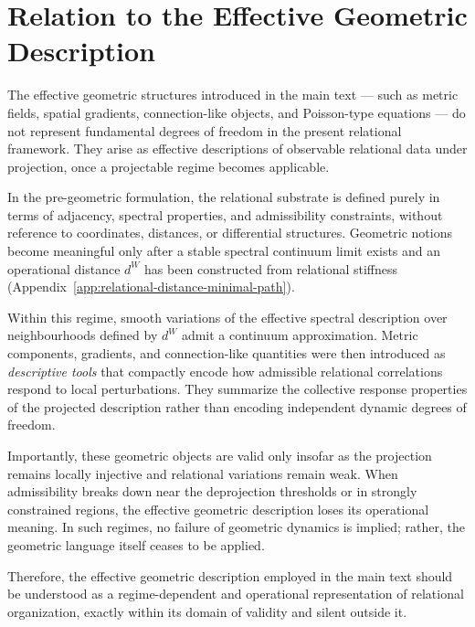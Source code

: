 \section{Relation to the Effective Geometric Description}
  \label{sec:relation-to-the-effective-geometric-description}

  The effective geometric structures introduced in the main text --- such as metric fields,
  spatial gradients, connection-like objects, and Poisson-type equations --- do not
  represent fundamental degrees of freedom in the present relational framework.
  They arise as effective descriptions of observable relational data under
  projection, once a projectable regime becomes applicable.

  In the pre-geometric formulation, the relational substrate is defined purely in terms
  of adjacency, spectral properties, and admissibility constraints, without reference to
  coordinates, distances, or differential structures.
  Geometric notions become meaningful only after a stable spectral continuum limit
  exists and an operational distance $d^W$ has been constructed from relational stiffness
  (Appendix~\ref{app:relational-distance-minimal-path}).

  Within this regime, smooth variations of the effective spectral description over
  neighbourhoods defined by $d^W$ admit a continuum approximation.
  Metric components, gradients, and connection-like quantities were then introduced
  as \textit{descriptive tools} that compactly encode how admissible relational
  correlations respond to local perturbations.
  They summarize the collective response properties of the projected description
  rather than encoding independent dynamic degrees of freedom.

  Importantly, these geometric objects are valid only insofar as the projection remains
  locally injective and relational variations remain weak.
  When admissibility breaks down near the deprojection thresholds or in strongly
  constrained regions, the effective geometric description loses its operational meaning.
  In such regimes, no failure of geometric dynamics is implied; rather, the geometric
  language itself ceases to be applied.

  Therefore, the effective geometric description employed in the main text should
  be understood as a regime-dependent and operational representation of relational
  organization, exactly within its domain of validity and silent outside it.
